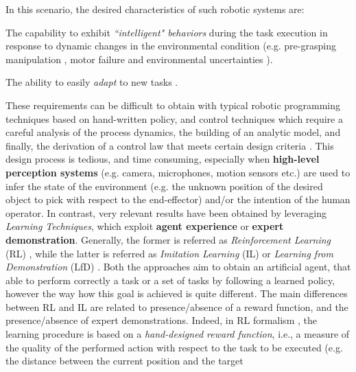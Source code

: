 In this scenario, the desired characteristics of such robotic systems are:\begin{enumerate*}[label=\textbf{(\alph*)}]
    \item The capability to exhibit \textit{``intelligent" behaviors} during the task execution in response to dynamic
    changes in the environmental condition (e.g. pre-grasping manipulation \cite{kalashnikov2018qt_opt}, motor failure
    and environmental uncertainties \cite{anne2021meta_learning_fast_adaptive}).
    \item The ability to easily \textit{adapt} to new tasks \cite{jang2022bc_z}. 
\end{enumerate*}
\newline These requirements can be difficult to obtain with typical robotic programming techniques based on hand-written
policy, and control techniques which require a careful analysis of the process dynamics, the building of an analytic
model, and finally, the derivation of a control law that meets certain design criteria
\cite{hafner2011reinforcement_in_feedback_controll}. This design process is tedious, and time consuming, especially when
\textbf{high-level perception systems} (e.g. camera, microphones, motion sensors etc.) are used to infer the state of
the environment (e.g. the unknown position of the desired object to pick with respect to the end-effector) and/or the
intention of the human operator. \newline In contrast, very relevant results have been obtained by leveraging
\textit{Learning Techniques}, which exploit \textbf{agent experience} or \textbf{expert demonstration}. Generally, the
former is referred as \textit{Reinforcement Learning} (RL) \cite{sutton2018reinforcement}, while the latter is referred
as \textit{Imitation Learning} (IL) or \textit{Learning from Demonstration} (LfD)
\cite{argall2009robot_learning_from_demonstration}. Both the approaches aim to obtain an artificial agent, that able to
perform correctly a task or a set of tasks by following a learned policy, however the way how this goal is achieved is
quite different. The main differences between RL and IL are related to presence/absence of a reward function, and the
presence/absence of expert demonstrations. \newline Indeed, in RL formalism \cite{kaelbling1996reinforcement_survey},
the learning procedure is based on a \textit{hand-designed reward function}, i.e., a measure of the quality of the
performed action with respect to the task to be executed (e.g. the distance between the current position and the target
